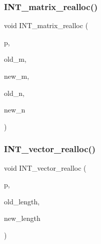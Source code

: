 \subsubsection{\texorpdfstring{I\+N\+T\+\_\+matrix\+\_\+realloc()}{INT\_matrix\_realloc()}}
{\footnotesize\ttfamily void I\+N\+T\+\_\+matrix\+\_\+realloc (\begin{DoxyParamCaption}\item[{\mbox{\hyperlink{galois_8h_a09fddde158a3a20bd2dcadb609de11dc}{I\+NT}} $\ast$\&}]{p,  }\item[{\mbox{\hyperlink{galois_8h_a09fddde158a3a20bd2dcadb609de11dc}{I\+NT}}}]{old\+\_\+m,  }\item[{\mbox{\hyperlink{galois_8h_a09fddde158a3a20bd2dcadb609de11dc}{I\+NT}}}]{new\+\_\+m,  }\item[{\mbox{\hyperlink{galois_8h_a09fddde158a3a20bd2dcadb609de11dc}{I\+NT}}}]{old\+\_\+n,  }\item[{\mbox{\hyperlink{galois_8h_a09fddde158a3a20bd2dcadb609de11dc}{I\+NT}}}]{new\+\_\+n }\end{DoxyParamCaption})}

\mbox{\label{global_8_c_aac2854538d5e7828ffc3cc9ccd157d74}} 
\subsubsection{\texorpdfstring{I\+N\+T\+\_\+vector\+\_\+realloc()}{INT\_vector\_realloc()}}
{\footnotesize\ttfamily void I\+N\+T\+\_\+vector\+\_\+realloc (\begin{DoxyParamCaption}\item[{\mbox{\hyperlink{galois_8h_a09fddde158a3a20bd2dcadb609de11dc}{I\+NT}} $\ast$\&}]{p,  }\item[{\mbox{\hyperlink{galois_8h_a09fddde158a3a20bd2dcadb609de11dc}{I\+NT}}}]{old\+\_\+length,  }\item[{\mbox{\hyperlink{galois_8h_a09fddde158a3a20bd2dcadb609de11dc}{I\+NT}}}]{new\+\_\+length }\end{DoxyParamCaption})}

\mbox{\label{global_8_c_a246199d005ae23aad214026100d03048}} 
